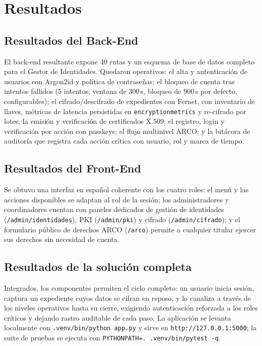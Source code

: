 \documentclass[10pt,letterpaper]{report}
\renewcommand{\_}{\textunderscore\allowbreak}
\begin{document}
\chapter{Resultados}

\section{Resultados del Back-End}
El back-end resultante expone 40 rutas y un esquema de base de datos completo
para el Gestor de Identidades. Quedaron operativos: el alta y autenticaci\'on de
usuarios con Argon2id y pol\'itica de contrase\~nas; el bloqueo de cuenta tras
intentos fallidos (5 intentos, ventana de 300\,s, bloqueo de 900\,s por defecto,
configurables); el cifrado/descifrado de expedientes con Fernet, con inventario
de llaves, m\'etricas de latencia persistidas en \texttt{encryption\_metrics} y
re-cifrado por lotes; la emisi\'on y verificaci\'on de certificados X.509; el
registro, login y verificaci\'on por acci\'on con passkeys; el flujo multinivel
ARCO; y la bit\'acora de auditor\'ia que registra cada acci\'on cr\'itica con
usuario, rol y marca de tiempo.

\section{Resultados del Front-End}
Se obtuvo una interfaz en espa\~nol coherente con los cuatro roles: el men\'u y
las acciones disponibles se adaptan al rol de la sesi\'on; los administradores y
coordinadores cuentan con paneles dedicados de gesti\'on de identidades
(\texttt{\slash admin\slash identidades}), PKI (\texttt{\slash admin\slash pki}) y cifrado
(\texttt{\slash admin\slash cifrado}); y el formulario p\'ublico de derechos ARCO
(\texttt{\slash arco}) permite a cualquier titular ejercer sus derechos sin necesidad
de cuenta.

\section{Resultados de la soluci\'on completa}
Integrados, los componentes permiten el ciclo completo: un usuario inicia
sesi\'on, captura un expediente cuyos datos se cifran en reposo, y lo canaliza a
trav\'es de los niveles operativos hasta su cierre, exigiendo autenticaci\'on
reforzada a los roles cr\'iticos y dejando rastro auditable de cada paso. La
aplicaci\'on se levanta localmente con \texttt{.venv/bin/python app.py} y sirve en
\texttt{http://127.0.0.1:5000}; la suite de pruebas se ejecuta con
\texttt{PYTHONPATH=. .venv/bin/pytest -q}.
\end{document}
